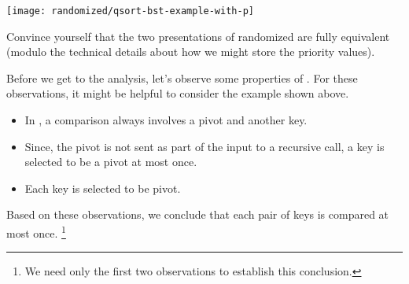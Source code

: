 {\begin{example}
\begin{center}
\texttt{[image: randomized/qsort-bst-example-with-p]}
\end{center}

\end{example}

\begin{exercise}
Convince yourself that the two
presentations of randomized \qsort{} are fully equivalent (modulo the
technical details about how we might store the priority values).
\end{exercise}

Before we get to the analysis, let's observe some properties of
\qsort{}.  For these observations, it might be helpful to consider the
example shown above.  
\begin{itemize}
\item In \qsort{}, a comparison always involves a
pivot and another key.  

\item Since, the pivot is not sent as part of the input to a recursive
  call, a key is selected to be a pivot at most once.

\item Each key is selected to be pivot.
 
\end{itemize}

Based on these observations, we conclude that each pair of keys is
compared at most once.
%
\footnote{We need only the first two observations to establish this
  conclusion.}
%







}
